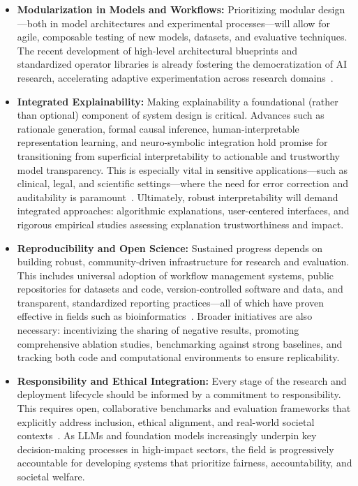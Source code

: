 \documentclass[sigconf]{acmart}
\begin{document}
\begin{itemize}
    \item \textbf{Modularization in Models and Workflows:} Prioritizing modular design—both in model architectures and experimental processes—will allow for agile, composable testing of new models, datasets, and evaluative techniques. The recent development of high-level architectural blueprints and standardized operator libraries is already fostering the democratization of AI research, accelerating adaptive experimentation across research domains~\cite{ref78,ref86,ref87,ref98,ref100}.
    
    \item \textbf{Integrated Explainability:} Making explainability a foundational (rather than optional) component of system design is critical. Advances such as rationale generation, formal causal inference, human-interpretable representation learning, and neuro-symbolic integration hold promise for transitioning from superficial interpretability to actionable and trustworthy model transparency. This is especially vital in sensitive applications—such as clinical, legal, and scientific settings—where the need for error correction and auditability is paramount~\cite{ref9,ref31,ref36,ref49,ref50,ref51,ref55,ref96,ref101}. Ultimately, robust interpretability will demand integrated approaches: algorithmic explanations, user-centered interfaces, and rigorous empirical studies assessing explanation trustworthiness and impact.
    
    \item \textbf{Reproducibility and Open Science:} Sustained progress depends on building robust, community-driven infrastructure for research and evaluation. This includes universal adoption of workflow management systems, public repositories for datasets and code, version-controlled software and data, and transparent, standardized reporting practices—all of which have proven effective in fields such as bioinformatics~\cite{ref81,ref83,ref91,ref92,ref95,ref97,ref99,ref106,ref107,ref108}. Broader initiatives are also necessary: incentivizing the sharing of negative results, promoting comprehensive ablation studies, benchmarking against strong baselines, and tracking both code and computational environments to ensure replicability.
    
    \item \textbf{Responsibility and Ethical Integration:} Every stage of the research and deployment lifecycle should be informed by a commitment to responsibility. This requires open, collaborative benchmarks and evaluation frameworks that explicitly address inclusion, ethical alignment, and real-world societal contexts~\cite{ref93,ref94,ref96,ref98,ref104,ref107,ref108}. As LLMs and foundation models increasingly underpin key decision-making processes in high-impact sectors, the field is progressively accountable for developing systems that prioritize fairness, accountability, and societal welfare.
\end{itemize}
\end{document}
